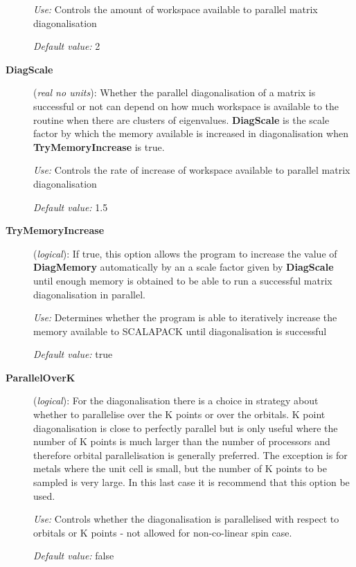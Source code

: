 \documentclass[11pt]{article}
\begin{document}
\begin{description}
{\it Use:} Controls the amount of workspace available to parallel
matrix diagonalisation

{\it Default value:}  2

\item[{\bf DiagScale}] ({\it real no units}):  Whether the parallel diagonalisation of a matrix is
successful or not can depend on how much workspace is available to the
routine when there are clusters of eigenvalues. {\bf DiagScale} is the
scale factor by which the memory available is increased in
diagonalisation when {\bf TryMemoryIncrease} is true.

{\it Use:} Controls the rate of increase of workspace available to
parallel matrix diagonalisation

{\it Default value:}  1.5

\item[{\bf TryMemoryIncrease}] ({\it logical}):
 If true, this option
allows the program to increase the value of {\bf DiagMemory}
automatically by an a scale factor given by {\bf DiagScale} until
enough memory is obtained to be able to run a successful matrix
diagonalisation in parallel.

{\it Use:} Determines whether the program is able to iteratively
  increase the memory available to SCALAPACK until diagonalisation is
  successful

{\it Default value:}  true

\item[{\bf ParallelOverK}] ({\it logical}):  For the diagonalisation there is a choice in strategy
about whether to parallelise over the K points or over the orbitals. K
point diagonalisation is close to perfectly parallel but is only
useful where the number of K points is much larger than the number of
processors and therefore orbital parallelisation is generally
preferred. The exception is for metals where the unit cell is small,
but the number of K points to be sampled is very large. In this last
case it is recommend that this option be used.

{\it Use:} Controls whether the diagonalisation is parallelised with
respect to orbitals or K points - not allowed for non-co-linear spin
case.

{\it Default value:}  false

\end{description}


\vspace{5pt}
\end{document}

